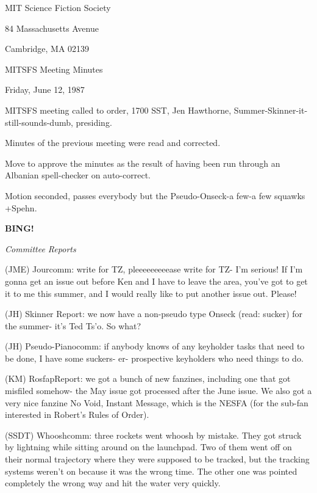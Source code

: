 \documentclass[12pt]{article}
\newcommand{\bing}{{\bf BING!} }
\newcommand{\goto}[1]{\bing \vskip 12pt \centerline{{\em{#1}}}}
\begin{document}
\begin{center}

MIT Science Fiction Society 

84 Massachusetts Avenue

Cambridge, MA 02139

\vspace{12pt}

MITSFS Meeting Minutes 

Friday, June 12, 1987

\end{center}
 
\vspace{18pt}

\setlength{\parskip}{6pt}

\noindent
MITSFS meeting called to order, 1700 SST,
Jen Hawthorne, Summer-Skinner-it-still-sounds-dumb, presiding.

Minutes of the previous meeting were read and corrected.

Move to approve the minutes as the result of having been run through an Albanian spell-checker on auto-correct.

Motion seconded, passes everybody but the Pseudo-Onseck-a few-a few squawks +Spehn.

\goto{Committee Reports}

(JME) Jourcomm: write for TZ, pleeeeeeeeease write for TZ- I'm serious! If I'm gonna get an issue out before Ken and I have to leave the area, you've got to get it to me this summer, and I would really like to put another issue out. Please!

(JH) Skinner Report: we now have a non-pseudo type Onseck (read: sucker) for the summer- it's Ted Ts'o. So what?

(JH) Pseudo-Pianocomm: if anybody knows of any keyholder tasks that need to be done, I have some suckers- er- prospective keyholders who need things to do.

(KM) RosfapReport: we got a bunch of new fanzines, including one that got misfiled somehow- the May issue got processed after the June issue. We also got a very nice fanzine No Void, Instant Message, which is the NESFA (for the sub-fan interested in Robert's Rules of Order).

(SSDT) Whooshcomm: three rockets went whoosh by mistake. They got struck by lightning while sitting around on the launchpad. Two of them went off on their normal trajectory where they were supposed to be tracked, but the tracking systems weren't on because it was the wrong time. The other one was pointed completely the wrong way and hit the water very quickly.
\end{document}
